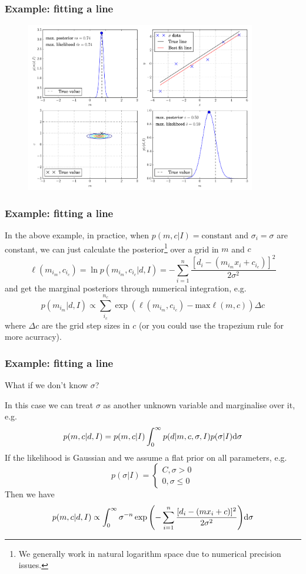 \begin{frame}

\frametitle{Example: fitting a line}
\label{example:fittingaline}

\begin{figure}[htbp]
\centering
\includegraphics[keepaspectratio,width=\textwidth,height=210pt]{figures/bayesian_line_fitting.pdf}
\label{bayesian_line_fitting}
\end{figure}

\end{frame}

\begin{frame}

\frametitle{Example: fitting a line}
\label{example:fittingaline}

In the above example, in practice, when $p(m,c|I) = \text{constant}$ and $\sigma_i = \sigma$ are constant, we can just calculate the posterior\footnote{We generally work in natural logarithm space due to numerical precision issues.} over a grid in $m$ and $c$
\[
\ell(m_{i_m},c_{i_c}) = \ln{p(m_{i_m},c_{i_c}|d,I)} = -\sum_{i=1}^n\frac{[d_i-(m_{i_m} x_i + c_{i_c})]^2}{2\sigma^2}
\]
and get the marginal posteriors through numerical integration, e.g.
\[
p(m_{i_m}|d,I) \propto \sum_{i_c}^{n_c} \exp{\left(\ell(m_{i_m},c_{i_c}) - \text{max}\ell(m,c)\right)} \Delta c
\]
where $\Delta c$ are the grid step sizes in $c$ (or you could use the trapezium rule for more acurracy).

\end{frame}

\begin{frame}

\frametitle{Example: fitting a line}
\label{example:fittingaline}

What if we don't know $\sigma$?

In this case we can treat $\sigma$ as another unknown variable and marginalise over it, e.g.
\[
p(m,c|d,I) = p(m,c|I) \int_0^{\infty} p(d|m,c,\sigma,I)p(\sigma|I) {\rm d}\sigma
\]
If the likelihood is Gaussian and we assume a flat prior on all parameters, e.g.
\[
p(\sigma|I) = \begin{cases}C, \sigma > 0 \\ 0, \sigma \le 0\end{cases}
\]
Then we have
\[
p(m,c|d,I) \propto \int_0^{\infty} \sigma^{-n} \exp{\left(-\sum_{i=1}^n\frac{[d_i-(m x_i + c)]^2}{2\sigma^2}\right)} {\rm d}\sigma
\]

\end{frame}


